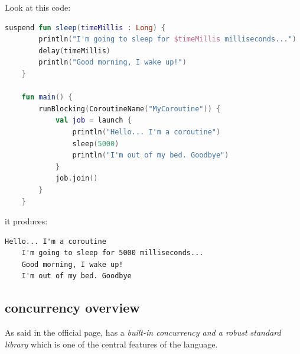 Look at this code:
\begin{lstlisting}[language=Kotlin]
	suspend fun sleep(timeMillis : Long) {
		println("I'm going to sleep for $timeMillis milliseconds...")
		delay(timeMillis)
		println("Good morning, I wake up!")
	}
	
	fun main() {
		runBlocking(CoroutineName("MyCoroutine")) {
			val job = launch {
				println("Hello... I'm a coroutine")
				sleep(5000)
				println("I'm out of my bed. Goodbye")
			}
			job.join()
		}
	}
\end{lstlisting}
it produces:
\begin{lstlisting}[numbers=none]
	Hello... I'm a coroutine
	I'm going to sleep for 5000 milliseconds...
	Good morning, I wake up!
	I'm out of my bed. Goodbye
\end{lstlisting}

\subsection{\Go concurrency overview}

As said in the official page, \Go has a \textit{built-in concurrency and a robust standard library} which is one of the central features of the language.
